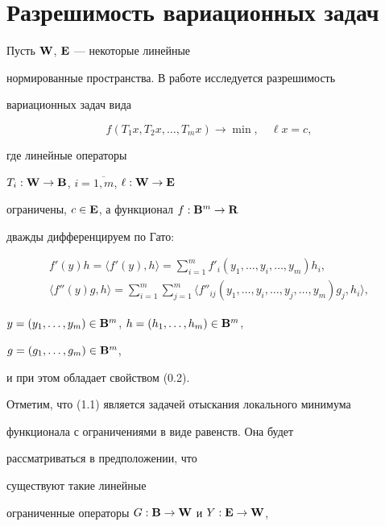 \section{Разрешимость вариационных задач}





Пусть $\bold W{}$, $\bold E{}$ --- некоторые линейные


нормированные пространства. В работе исследуется разрешимость


вариационных задач вида


\begin{equation}


f(T_1x,T_2x,\dotsc,T_mx)\longrightarrow\min,\quad


\ell x=c,


\end{equation}


где линейные операторы


$T_i:\bold W{}\to\bold B{}$, $i=\overline{1,m}$, $\ell:\bold W{}\to\bold E{}$


ограничены, $c\in\bold E{}$, а функционал $f:\bold B{}^m\to\bold R{}$


дважды дифференцируем по Гато:


\begin{gather*}


f'(y)h=\langle f'(y),h\rangle=\sum_{i=1}^mf'_i(y_1,\dotsc,y_i,\dotsc,y_m)h_i,\\


\langle f''(y)g,h\rangle=\sum_{i=1}^m\sum_{j=1}^m


\langle f''_{ij}(y_1,\dotsc,y_i,\dotsc,y_j,\dotsc,y_m)g_j,h_i\rangle,


\end{gather*}


$y=(y_1,\dotsc,y_m)\in\bold B{}^m$, $h=(h_1,\dotsc,h_m)\in\bold B{}^m$,


$g=(g_1,\dotsc,g_m)\in\bold B{}^m$,


и при этом обладает свойством (0.2).





Отметим, что (1.1) является задачей отыскания локального минимума


функционала с ограничениями в виде равенств. Она будет


рассматриваться в предположении, что


существуют такие линейные


ограниченные операторы $G:\bold B{}\to\bold W{}$ и $Y:\bold E{}\to\bold W{}$,


